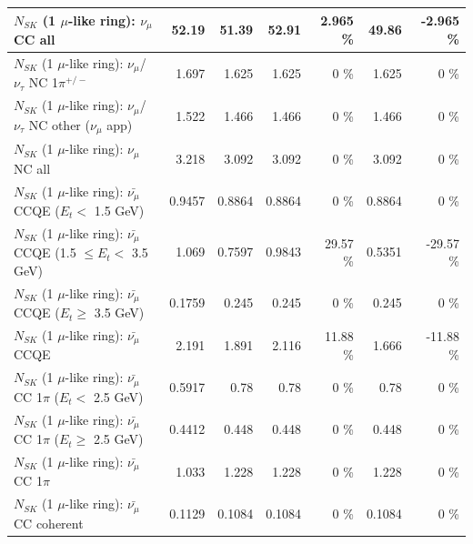 \begin{table}
\begin{tabular}{| l | r | r | r  r | r  r |}
                                $N_{SK}$ (1 $\mu$-like ring): $\nu_{\mu}$ CC all &           52.19 &           51.39 &           52.91 &    2.965 \%  &           49.86 &   -2.965 \%  \\ 
\hline
              $N_{SK}$ (1 $\mu$-like ring): $\nu_\mu$/$\nu_\tau$ NC 1$\pi^{+/-}$ &           1.697 &           1.625 &           1.625 &        0 \%  &           1.625 &        0 \%  \\ 
     $N_{SK}$ (1 $\mu$-like ring): $\nu_\mu$/$\nu_\tau$ NC other ($\nu_\mu$ app) &           1.522 &           1.466 &           1.466 &        0 \%  &           1.466 &        0 \%  \\ 
                                $N_{SK}$ (1 $\mu$-like ring): $\nu_{\mu}$ NC all &           3.218 &           3.092 &           3.092 &        0 \%  &           3.092 &        0 \%  \\ 
\hline
\hline
\hline
          $N_{SK}$ (1 $\mu$-like ring): $\bar{\nu_\mu}$ CCQE ($E_{t} <$ 1.5 GeV) &          0.9457 &          0.8864 &          0.8864 &        0 \%  &          0.8864 &        0 \%  \\ 
 $N_{SK}$ (1 $\mu$-like ring): $\bar{\nu_\mu}$ CCQE (1.5 $\leq E_{t} <$ 3.5 GeV) &           1.069 &          0.7597 &          0.9843 &    29.57 \%  &          0.5351 &   -29.57 \%  \\ 
       $N_{SK}$ (1 $\mu$-like ring): $\bar{\nu_\mu}$ CCQE ($E_{t} \geq$ 3.5 GeV) &          0.1759 &           0.245 &           0.245 &        0 \%  &           0.245 &        0 \%  \\ 
\hline
                              $N_{SK}$ (1 $\mu$-like ring): $\bar{\nu_\mu}$ CCQE &           2.191 &           1.891 &           2.116 &    11.88 \%  &           1.666 &   -11.88 \%  \\ 
\hline
     $N_{SK}$ (1 $\mu$-like ring): $\bar{\nu_\mu}$ CC 1$\pi$ ($E_{t} <$ 2.5 GeV) &          0.5917 &            0.78 &            0.78 &        0 \%  &            0.78 &        0 \%  \\ 
  $N_{SK}$ (1 $\mu$-like ring): $\bar{\nu_\mu}$ CC 1$\pi$ ($E_{t} \geq$ 2.5 GeV) &          0.4412 &           0.448 &           0.448 &        0 \%  &           0.448 &        0 \%  \\ 
\hline
                         $N_{SK}$ (1 $\mu$-like ring): $\bar{\nu_\mu}$ CC 1$\pi$ &           1.033 &           1.228 &           1.228 &        0 \%  &           1.228 &        0 \%  \\ 
                       $N_{SK}$ (1 $\mu$-like ring): $\bar{\nu_\mu}$ CC coherent &          0.1129 &          0.1084 &          0.1084 &        0 \%  &          0.1084 &        0 \%  \\ 

\end{tabular}
\end{table}
